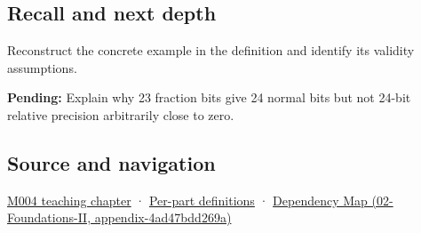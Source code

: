 \subsection{Recall and next depth}\label{recall-and-next-depth}

Reconstruct the concrete example in the definition and identify its validity assumptions.

\textbf{Pending:} Explain why 23 fraction bits give 24 normal bits but not 24-bit relative precision arbitrarily close to zero.

\subsection{Source and navigation}\label{source-and-navigation}

\href{Continuous\%20Notes/Computing\%20Foundations\%20-\%20From\%20Bits\%20to\%20C++\%20and\%20Systems\%20APIs\#A\%20stretching\%20ruler\%20for\%20real-valued\%20quantities}{M004 teaching chapter} · \hyperref[appendix-fd090d982a15]{Per-part definitions} · \href{}{Dependency Map (02-Foundations-II, appendix-4ad47bdd269a)}
